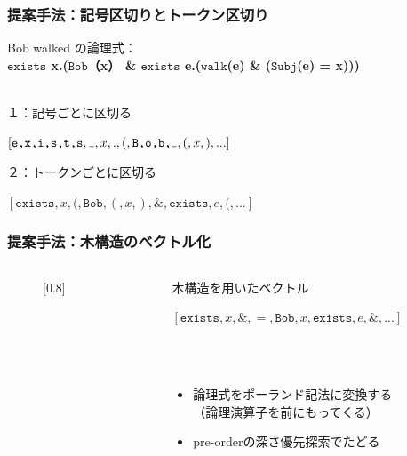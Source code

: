 \documentclass[dvipdfmx]{beamer}
\newcommand{\LF}[1]{\ensuremath{\texttt{#1}}}
\newcommand\vartextvisiblespace[1][.5em]{%
  \makebox[#1]{%
    \kern.07em
    \vrule height.3ex
    \hrulefill
    \vrule height.3ex
    \kern.07em
  }%
}
\begin{document}
\begin{frame}
\frametitle{提案手法：記号区切りとトークン区切り}
Bob walked の論理式：\\
\textbf{
  \LF{exists} x.(\LF{Bob}（x） \& \LF{exists} e.(\LF{walk}(e) \& (\LF{Subj}(e) = x)))
}
\\~\
\begin{block}{１：記号ごとに区切る}
\begin{center}
$[\LF{e,x,i,s,t,s}, {\tt \vartextvisiblespace}, x,.,(,\LF{B,o,b,}{\tt \vartextvisiblespace},(,x,),...]$
\end{center}
\end{block}
\begin{block}{２：トークンごとに区切る}
\begin{center}
  $[\LF{exists},x,(,\LF{Bob},(,x,),\&,\LF{exists},e,(,...]$
\end{center}
\end{block}
\end{frame}


\begin{frame}
\frametitle{提案手法：木構造のベクトル化}
\begin{columns}[t]
    \begin{column}{0.4\textwidth} %
        \begin{figure}[h]
        \begin{center}
          \scalebox{}[0.8]{
          }
        \end{center}
        \end{figure}
    \end{column}
    \begin{column}{0.6\textwidth} %
      \begin{block}{木構造を用いたベクトル}
        \begin{center}
          $[\LF{exists},x,\&,=,\LF{Bob},x,\LF{exists},e,\&,...]$
        \end{center}
      \end{block}
      \\~\
      \begin{itemize}
        \item 論理式をポーランド記法に変換する\\（論理演算子を前にもってくる）
        \item pre-orderの深さ優先探索でたどる
      \end{itemize}
    \end{column}
\end{columns}

\end{frame}
\end{document}
